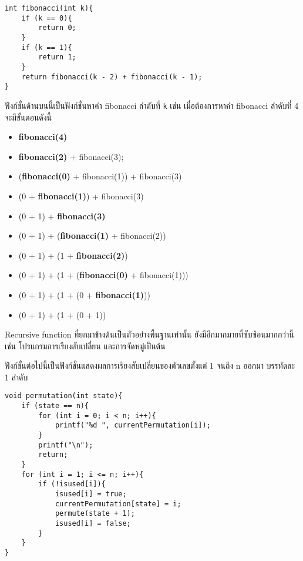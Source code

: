 \begin{lstlisting}
int fibonacci(int k){
	if (k == 0){
		return 0;
	}
	if (k == 1){
		return 1;
	}
	return fibonacci(k - 2) + fibonacci(k - 1);
}
\end{lstlisting}
ฟังก์ชั่นด้านบนนี้เป็นฟังก์ชั่นหาค่า fibonacci ลำดับที่ \texttt{k} เช่น เมื่อต้องการหาค่า fibonacci ลำดับที่ 4 จะมีขั้นตอนดังนี้
\begin{itemize}
\item \textbf{fibonacci(4)}
\item \textbf{fibonacci(2)} + fibonacci(3);
\item (\textbf{fibonacci(0)} + fibonacci(1)) + fibonacci(3)
\item (0 + \textbf{fibonacci(1)}) + fibonacci(3)
\item (0 + 1) + \textbf{fibonacci(3)}
\item (0 + 1) + (\textbf{fibonacci(1)} + fibonacci(2))
\item (0 + 1) + (1 + \textbf{fibonacci(2)})
\item (0 + 1) + (1 + (\textbf{fibonacci(0)} + fibonacci(1)))
\item (0 + 1) + (1 + (0 + \textbf{fibonacci(1)}))
\item (0 + 1) + (1 + (0 + 1))
\end{itemize}

	Recursive function ที่ยกมาข้างต้นเป็นตัวอย่างพื้นฐานเท่านั้น ยังมีอีกมากมายที่ซับซ้อนมากกว่านี้ เช่น โปรแกรมการเรียงสับเปลี่ยน และการจัดหมู่เป็นต้น
\begin{example}
ฟังก์ชั่นต่อไปนี้เป็นฟังก์ชั่นแสดงผลการเรียงสับเปลี่ยนของตัวเลขตั้งแต่ 1 จนถึง n ออกมา บรรทัดละ 1 ลำดับ
    \begin{lstlisting}
void permutation(int state){
	if (state == n){
		for (int i = 0; i < n; i++){
			printf("%d ", currentPermutation[i]);
		}
		printf("\n");
		return;
	}
	for (int i = 1; i <= n; i++){
		if (!isused[i]){
			isused[i] = true;
			currentPermutation[state] = i;
			permute(state + 1);
			isused[i] = false;
		}
	}
}
    \end{lstlisting}
\end{example}
